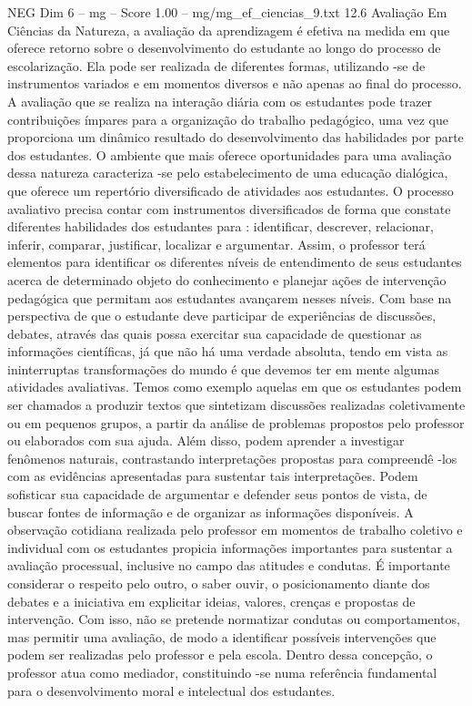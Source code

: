\begin{textsample}{NEG Dim 6 – mg – Score 1.00 – mg/mg\_ef\_ciencias\_9.txt}  \label{ex:f6_neg_049}
12.6 Avaliação Em Ciências da Natureza, a avaliação da aprendizagem é efetiva na medida em que oferece retorno sobre o desenvolvimento do estudante ao longo do processo de escolarização.
Ela pode ser realizada de diferentes formas, utilizando -se de instrumentos variados e em momentos diversos e não apenas ao final do processo.
A avaliação que se realiza na interação diária com os estudantes pode trazer contribuições ímpares para a organização do trabalho pedagógico, uma vez que proporciona um dinâmico resultado do desenvolvimento das habilidades por parte dos estudantes.
O ambiente que mais oferece oportunidades para uma avaliação dessa natureza caracteriza -se pelo estabelecimento de uma educação dialógica, que oferece um repertório diversificado de atividades aos estudantes.
O processo avaliativo precisa contar com instrumentos diversificados de forma que constate diferentes habilidades dos estudantes para : identificar, descrever, relacionar, inferir, comparar, justificar, localizar e argumentar.
Assim, o professor terá elementos para identificar os diferentes níveis de entendimento de seus estudantes acerca de determinado objeto do conhecimento e planejar ações de intervenção pedagógica que permitam aos estudantes avançarem nesses níveis.
Com base na perspectiva de que o estudante deve participar de experiências de discussões, debates, através das quais possa exercitar sua capacidade de questionar as informações científicas, já que não há uma verdade absoluta, tendo em vista as ininterruptas transformações do mundo é que devemos ter em mente algumas atividades avaliativas.
Temos como exemplo aquelas em que os estudantes podem ser chamados a produzir textos que sintetizam discussões realizadas coletivamente ou em pequenos grupos, a partir da análise de problemas propostos pelo professor ou elaborados com sua ajuda.
Além disso, podem aprender a investigar fenômenos naturais, contrastando interpretações propostas para compreendê -los com as evidências apresentadas para sustentar tais interpretações.
Podem sofisticar sua capacidade de argumentar e defender seus pontos de vista, de buscar fontes de informação e de organizar as informações disponíveis.
A observação cotidiana realizada pelo professor em momentos de trabalho coletivo e individual com os estudantes propicia informações importantes para sustentar a avaliação processual, inclusive no campo das atitudes e condutas.
É importante considerar o respeito pelo outro, o saber ouvir, o posicionamento diante dos debates e a iniciativa em explicitar ideias, valores, crenças e propostas de intervenção.
Com isso, não se pretende normatizar condutas ou comportamentos, mas permitir uma avaliação, de modo a identificar possíveis intervenções que podem ser realizadas pelo professor e pela escola.
Dentro dessa concepção, o professor atua como mediador, constituindo -se numa referência fundamental para o desenvolvimento moral e intelectual dos estudantes.

\end{textsample}
